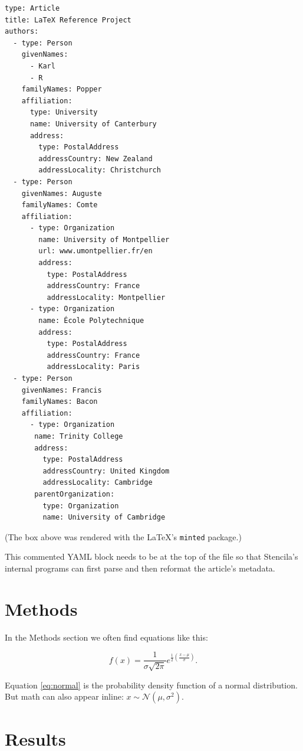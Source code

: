 \documentclass[12pt]{article}
\begin{document}
{\singlespace
\begin{verbatim}
type: Article
title: LaTeX Reference Project
authors:
  - type: Person
    givenNames:
      - Karl
      - R
    familyNames: Popper
    affiliation:
      type: University
      name: University of Canterbury
      address:
        type: PostalAddress
        addressCountry: New Zealand
        addressLocality: Christchurch
  - type: Person
    givenNames: Auguste
    familyNames: Comte
    affiliation:
      - type: Organization
        name: University of Montpellier
        url: www.umontpellier.fr/en
        address:
          type: PostalAddress
          addressCountry: France
          addressLocality: Montpellier
      - type: Organization
        name: École Polytechnique      
        address:
          type: PostalAddress
          addressCountry: France
          addressLocality: Paris
  - type: Person
    givenNames: Francis
    familyNames: Bacon
    affiliation:
      - type: Organization
       name: Trinity College
       address:
         type: PostalAddress
         addressCountry: United Kingdom
         addressLocality: Cambridge
       parentOrganization:
         type: Organization
         name: University of Cambridge
\end{verbatim}
}

\noindent (The box above was rendered with the \LaTeX 's \texttt{minted}
package.)

This commented YAML block needs to be at the top of the file so that
Stencila's internal programs can first parse and then reformat the
article's metadata.

\section*{Methods}

In the Methods section we often find equations like this:

\begin{equation}
  f(x) = \frac{1}{\sigma
    \sqrt{2\pi}}e^{\frac{1}{2}(\frac{x-\mu}{\sigma})}.
  \label{eq:normal}
\end{equation}

Equation \ref{eq:normal} is the probability density function of a
normal distribution.
But math can also appear inline: $x \sim \mathcal{N}(\mu,
\sigma^2)$.

\section*{Results}
\end{document}
